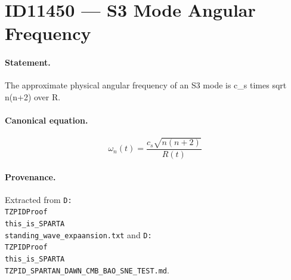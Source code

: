 \section*{ID11450 --- S3 Mode Angular Frequency}

\paragraph{Statement.}
The approximate physical angular frequency of an S3 mode is c_s times sqrt n(n+2) over R.

\paragraph{Canonical equation.}
\[
\omega_n(t)=\frac{c_s\sqrt{n(n+2)}}{R(t)}
\]

\paragraph{Provenance.}
Extracted from \texttt{D:\\TZPIDProof\\this\_is\_SPARTA\\standing\_wave\_expaansion.txt} and \texttt{D:\\TZPIDProof\\this\_is\_SPARTA\\TZPID\_SPARTAN\_DAWN\_CMB\_BAO\_SNE\_TEST.md}.
